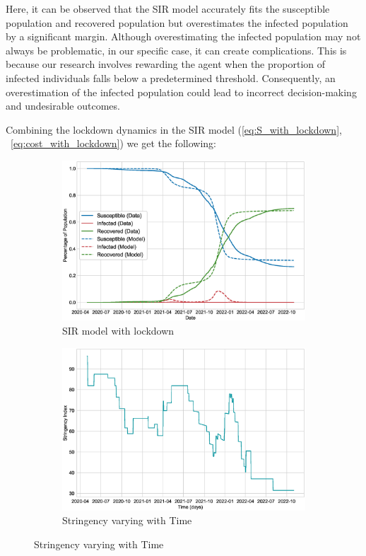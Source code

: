 \documentclass[tikz,fleqn,12pt]{wlscirep}
\begin{document}
Here, it can be observed that the SIR model accurately fits the susceptible population and recovered population but overestimates the infected population by a significant margin. Although overestimating the infected population may not always be problematic, in our specific case, it can create complications. This is because our research involves rewarding the agent when the proportion of infected individuals falls below a predetermined threshold. Consequently, an overestimation of the infected population could lead to incorrect decision-making and undesirable outcomes.

Combining the lockdown dynamics in the SIR model (\ref{eq:S_with_lockdown}, ~\ref{eq:cost_with_lockdown}) we get the following:
\begin{figure}[H]
  \centering
  \caption{SIR Model with lockdown for India}

  \begin{subfigure}[t]{\textwidth}
    \centering
    \includegraphics[scale=0.50]{images/SIR_model_with_lockdown_IND.eps}
    \caption{SIR model with lockdown}
    \label{fig:SIR_model_with_lockdown_IND}
  \end{subfigure}
  
  \begin{subfigure}[t]{\textwidth}
    \centering
    \includegraphics[scale=0.50]{images/stringency_varying_with_time_IND.eps}
    \caption{Stringency varying with Time}
    \label{fig:stringency_varying_with_time_IND}
  \end{subfigure}
\end{figure}
\end{document}
